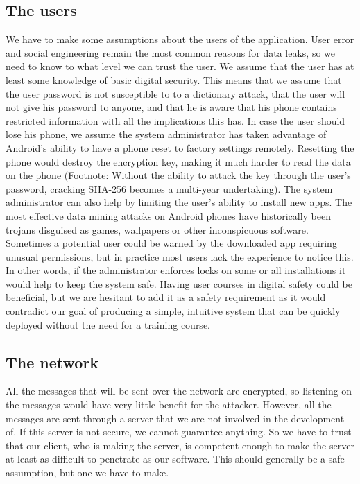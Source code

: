 \subsection{The users}
We have to make some assumptions about the users of the application. User error and social engineering remain the most common reasons for data leaks, so we need to know to what level we can trust the user.
\newline
\newline
We assume that the user has at least some knowledge of basic digital security. This means that we assume that the user password is not susceptible to to a dictionary attack, that the user will not give his password to anyone, and that he is aware that his phone contains restricted information with all the implications this has. 
\newline
\newline
In case the user should lose his phone, we assume the system administrator has taken advantage of Android’s ability to have a phone reset to factory settings remotely. Resetting the phone would destroy the encryption key, making it much harder to read the data on the phone (Footnote: Without the ability to attack the key through the user’s password, cracking SHA-256 becomes a multi-year undertaking).
\newline
\newline
The system administrator can also help by limiting the user’s ability to install new apps. The most effective data mining attacks on Android phones have historically been trojans disguised as games, wallpapers or other inconspicuous software. Sometimes a potential user could be warned by the downloaded app requiring unusual permissions, but in practice most users lack the experience to notice this. In other words, if the administrator enforces locks on some or all installations it would help to keep the system safe.
\newline
\newline
Having user courses in digital safety could be beneficial, but we are hesitant to add it as a safety requirement as it would contradict our goal of producing a simple, intuitive system that can be quickly deployed without the need for a training course. 

\subsection{The network}
All the messages that will be sent over the network are encrypted, so listening on the messages would have very little benefit for the attacker. However, all the messages are sent through a server that we are not involved in the development of. If this server is not secure, we cannot guarantee anything. So we have to trust that our client, who is making the server, is competent enough to make the server at least as difficult to penetrate as our software. This should generally be a safe assumption, but one we have to make.